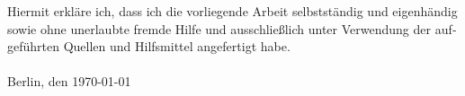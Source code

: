 \pagestyle{plain}
\setcounter{page}{1}
\begin{otherlanguage}{ngerman}
Hiermit erkläre ich, dass ich die vorliegende Arbeit selbstständig und eigenhändig sowie ohne unerlaubte fremde Hilfe und ausschließlich unter Verwendung der aufgeführten Quellen und Hilfsmittel angefertigt habe.\\[1.5em]
\underline{\hspace{12em}}\\
Berlin, den \today
\end{otherlanguage}
\newpage